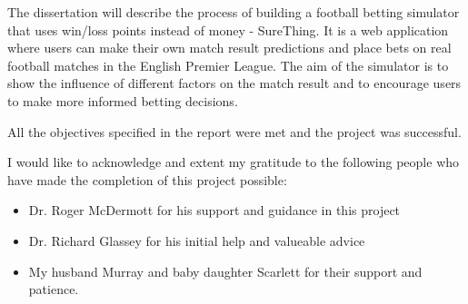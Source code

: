 \beforeabstract
{}
The dissertation will describe the process of building a football betting simulator that uses win/loss points instead of money - SureThing. It is a web application where users can make their own match result predictions and place bets on real football matches in the English Premier League. The aim of the simulator is to show the influence of different factors on the match result and to encourage users to make more informed betting decisions.

All the objectives specified in the report were met and the project was successful.

I would like to acknowledge and extent my gratitude to the following people who have made the completion of this project possible:

\begin{itemize}
	 \item Dr. Roger McDermott for his support and guidance in this project
	 \item Dr. Richard Glassey for his initial help and valueable advice
	 \item My husband Murray and baby daughter Scarlett for their support and patience.
 \end{itemize}

\afterpreface 
\afterabstract
